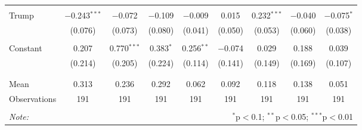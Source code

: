 \begin{tabular}{@{\extracolsep{5pt}}lcccccccc}
  & & & & & & & & \\ 
 Trump & $-$0.243$^{***}$ & $-$0.072 & $-$0.109 & $-$0.009 & 0.015 & 0.232$^{***}$ & $-$0.040 & $-$0.075$^{*}$ \\ 
  & (0.076) & (0.073) & (0.080) & (0.041) & (0.050) & (0.053) & (0.060) & (0.038) \\ 
  & & & & & & & & \\ 
 Constant & 0.207 & 0.770$^{***}$ & 0.383$^{*}$ & 0.256$^{**}$ & $-$0.074 & 0.029 & 0.188 & 0.039 \\ 
  & (0.214) & (0.205) & (0.224) & (0.114) & (0.141) & (0.149) & (0.169) & (0.107) \\ 
  & & & & & & & & \\ 
\hline \\[-1.8ex] 
Mean & 0.313 & 0.236 & 0.292 & 0.062 & 0.092 & 0.118 & 0.138 & 0.051 \\ 
Observations & 191 & 191 & 191 & 191 & 191 & 191 & 191 & 191 \\ 
\hline 
\hline \\[-1.8ex] 
\textit{Note:}  & \multicolumn{8}{r}{$^{*}$p$<$0.1; $^{**}$p$<$0.05; $^{***}$p$<$0.01} \\ 
\end{tabular} 
